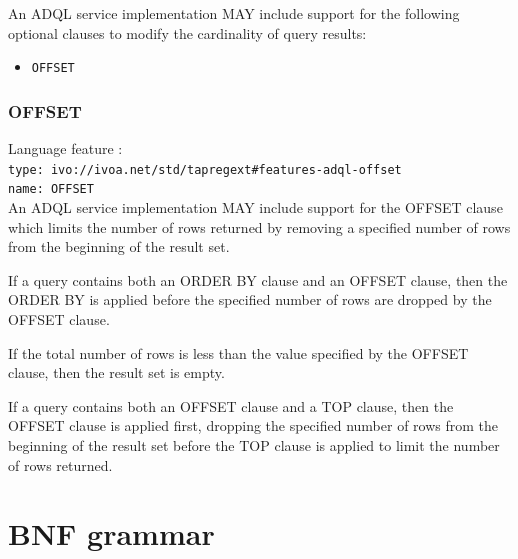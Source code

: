 \documentclass[11pt,a4paper]{ivoa}
\begin{document}
An ADQL service implementation MAY include support for the following optional
clauses to modify the cardinality of query results:

\begin{itemize}
    \item \verb:OFFSET:
\end{itemize}

\subsubsection{OFFSET}
\label{sec:offset}

{\footnotesize Language feature :}\\
{\footnotesize \verb|type: ivo://ivoa.net/std/tapregext#features-adql-offset|}\\
{\footnotesize \verb|name: OFFSET|}\\

An ADQL service implementation MAY include support for the OFFSET clause
which limits the number of rows returned by removing a specified number
of rows from the beginning of the result set.

If a query contains both an ORDER BY clause and an OFFSET clause,
then the ORDER BY is applied before the specified number of 
rows are dropped by the OFFSET clause.

If the total number of rows is less than the value
specified by the OFFSET clause, then the result set is empty.

If a query contains both an OFFSET clause and a TOP clause,
then the OFFSET clause is applied first, dropping the specified
number of rows from the beginning of the result set before the
TOP clause is applied to limit the number of rows returned.

\clearpage %
\appendix
\section{BNF grammar}
\label{sec:grammar}
\end{document}

